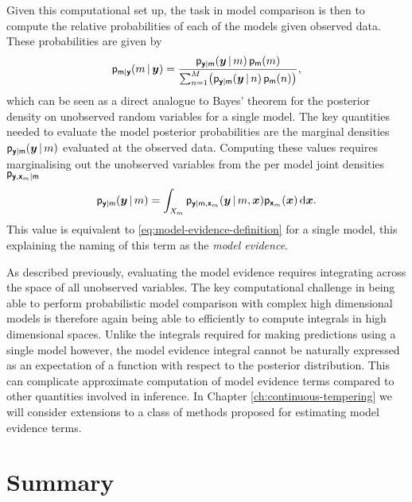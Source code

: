 Given this computational set up, the task in model comparison is then to compute the relative probabilities of each of the models given observed data. These probabilities are given by
\begin{equation}\label{eq:model-posterior}
  \pden{\rvar{m}|\rvct{y}}(m\gvn\vct{y}) = 
  \frac{\pden{\rvct{y}|\rvar{m}}(\vct{y}\gvn m)\,\pden{\rvar{m}}(m)}
  {\sum_{n=1}^M \lpa \pden{\rvct{y}|\rvar{m}}(\vct{y}\gvn n)\,\pden{\rvar{m}}(n)\rpa},
\end{equation}
which can be seen as a direct analogue to Bayes' theorem for the posterior density on unobserved random variables for a single model. The key quantities needed to evaluate the model posterior probabilities are the marginal densities $\mathsf{p}_{\boldsymbol{\mathsf{y}}|\mathsf{m}}(\boldsymbol{y}\operatorname{|} m)$ evaluated at the observed data. Computing these values requires marginalising out the unobserved variables from the per model joint densities $\mathsf{p}_{\boldsymbol{\mathsf{y}},\boldsymbol{\mathsf{x}}_m|\mathsf{m}}$
\begin{equation}\label{eq:model-marginal-den}
  \mathsf{p}_{\boldsymbol{\mathsf{y}}|\mathsf{m}}(\boldsymbol{y}\operatorname{|} m) = 
  \int_{\mathit{X}_m} \mathsf{p}_{\boldsymbol{\mathsf{y}}|\mathsf{m},\boldsymbol{\mathsf{x}}_m}(\boldsymbol{y}\operatorname{|} m, \boldsymbol{x}) \mathsf{p}_{\boldsymbol{\mathsf{x}}_m}(\boldsymbol{x})
  \,\mathrm{d}\boldsymbol{x}.
\end{equation}
This value is equivalent to \eqref{eq:model-evidence-definition} for a single model, this explaining the naming of this term as the \emph{model evidence}.

As described previously, evaluating the model evidence requires integrating across the space of all unobserved variables. The key computational challenge in being able to perform probabilistic model comparison with complex high dimensional models is therefore again being able to efficiently to compute integrals in high dimensional spaces. Unlike the integrals required for making predictions using a single model however, the model evidence integral cannot be naturally expressed as an expectation of a function with respect to the posterior distribution. This can complicate approximate computation of model evidence terms compared to other quantities involved in inference. In Chapter \ref{ch:continuous-tempering} we will consider extensions to a class of methods proposed for estimating model evidence terms.

\section{Summary}

